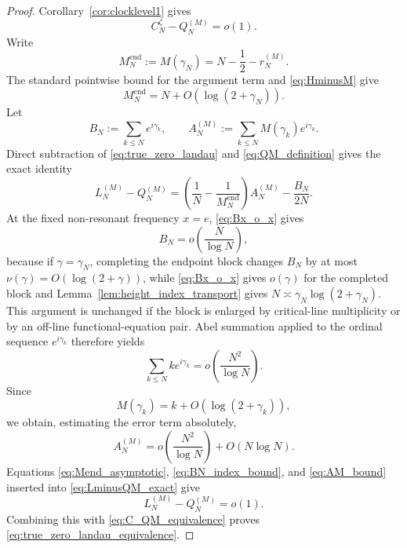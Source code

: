 \documentclass[11pt]{amsart}
\numberwithin{equation}{section}
\theoremstyle{definition}
\theoremstyle{remark}
\begin{document}
\begin{proof}
Corollary~\ref{cor:clocklevel1} gives
\begin{equation}\label{eq:C_QM_equivalence}
C_N^{\zeta}-Q_N^{(M)}=o(1).
\end{equation}
Write
\begin{equation}\label{eq:Mend_definition}
M_N^{\mathrm{end}}:=M(\gamma_N)=N-\frac12-r_N^{(M)}.
\end{equation}
The standard pointwise bound for the argument term and \eqref{eq:HminusM} give
\begin{equation}\label{eq:Mend_asymptotic}
M_N^{\mathrm{end}}=N+O(\log(2+\gamma_N)).
\end{equation}
Let
\begin{equation}\label{eq:BN_AM_definitions}
B_N:=\sum_{k\leq N}e^{i\gamma_k},
\qquad
A_N^{(M)}:=\sum_{k\leq N}M(\gamma_k)e^{i\gamma_k}.
\end{equation}
Direct subtraction of \eqref{eq:true_zero_landau} and \eqref{eq:QM_definition} gives the exact identity
\begin{equation}\label{eq:LminusQM_exact}
L_N^{(M)}-Q_N^{(M)}
=\left(\frac1N-\frac1{M_N^{\mathrm{end}}}\right)A_N^{(M)}
-\frac{B_N}{2N}.
\end{equation}
At the fixed non-resonant frequency $x=e$, \eqref{eq:Bx_o_x} gives
\begin{equation}\label{eq:BN_index_bound}
B_N=o\!\left(\frac{N}{\log N}\right),
\end{equation}
because if $\gamma=\gamma_N$, completing the endpoint block changes $B_N$ by at most $\nu(\gamma)=O(\log(2+\gamma))$, while \eqref{eq:Bx_o_x} gives $o(\gamma)$ for the completed block and Lemma~\ref{lem:height_index_transport} gives $N\asymp\gamma_N\log(2+\gamma_N)$. This argument is unchanged if the block is enlarged by critical-line multiplicity or by an off-line functional-equation pair. Abel summation applied to the ordinal sequence $e^{i\gamma_k}$ therefore yields
\begin{equation}\label{eq:k_phase_bound}
\sum_{k\leq N}k e^{i\gamma_k}
=o\!\left(\frac{N^2}{\log N}\right).
\end{equation}
Since
\begin{equation}\label{eq:M_gamma_k_rank}
M(\gamma_k)=k+O(\log(2+\gamma_k)),
\end{equation}
we obtain, estimating the error term absolutely,
\begin{equation}\label{eq:AM_bound}
A_N^{(M)}
=o\!\left(\frac{N^2}{\log N}\right)+O(N\log N).
\end{equation}
Equations \eqref{eq:Mend_asymptotic}, \eqref{eq:BN_index_bound}, and \eqref{eq:AM_bound} inserted into \eqref{eq:LminusQM_exact} give
\begin{equation}\label{eq:LminusQM_o1}
L_N^{(M)}-Q_N^{(M)}=o(1).
\end{equation}
Combining this with \eqref{eq:C_QM_equivalence} proves \eqref{eq:true_zero_landau_equivalence}.
\end{proof}
\end{document}
